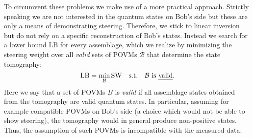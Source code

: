 \documentclass[aps,pra,twocolumn,superscriptaddress,showemail,showpacs,longbibliography]{revtex4-2}
\newcommand{\Op}[1]{\ensuremath{\mathrm{#1}}}
\begin{document}
To circumvent these problems we make use of a more practical approach. Strictly speaking we are not interested in the quantum states on Bob's side but these are only a means of demonstrating steering. Therefore, we stick to linear inversion but do not rely on a specific reconstruction of Bob's states. Instead we search for a lower bound \Op{LB} for every assemblage, which we realize by minimizing the steering weight over all \emph{valid} sets of POVMs $\mathcal{B}$ that determine the state tomography:
\begin{equation}
    \Op{LB} = \min_\mathcal{B} \Op{SW} \quad \text{s.t.} \quad \mathcal{B} \text{ is \emph{valid}}.
\end{equation}
Here we say that a set of POVMs $B$ is \emph{valid} if all assemblage states obtained from the tomography are valid quantum states. In particular, assuming for example compatible POVMs on Bob's side (a choice which would not be able to show steering), the tomography would in general produce non-positive states. Thus, the assumption of such POVMs is incompatible with the measured data.
\end{document}

